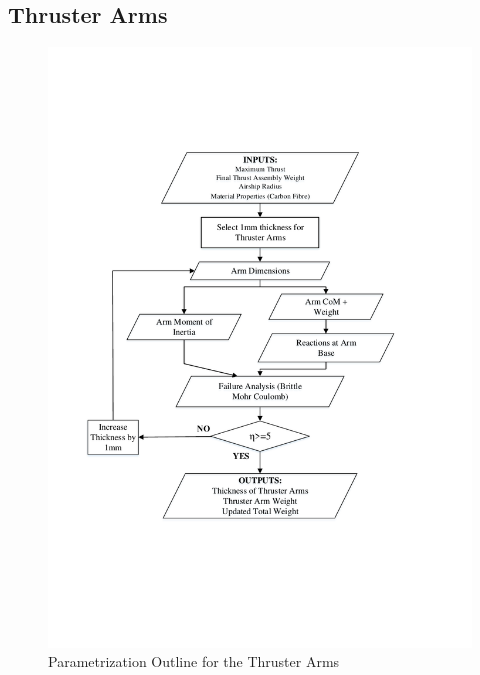 \documentclass[../main.tex]{subfiles}
\begin{document}
\subsection{Thruster Arms} \label{thrustArms}

\begin{figure}[H]
	\centering
	\includegraphics[width=.9\linewidth]{img/paramaterization/thrusterArms.pdf}
	\caption{Parametrization Outline for the Thruster Arms}
	\label{fig:thrusterArmsParametrization}
\end{figure}
\end{document}
